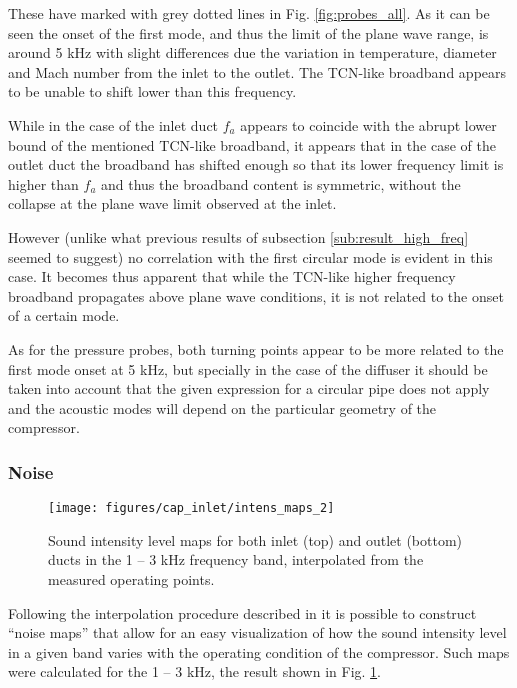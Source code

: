 These have marked with grey dotted lines in Fig. \ref{fig:probes_all}. As it can be seen the onset of the first mode, and thus the limit of the plane wave range, is around 5 kHz with slight differences due the variation in temperature, diameter and Mach number from the inlet to the outlet. The TCN-like broadband appears to be unable to shift lower than this frequency.

While in the case of the inlet duct $f_a$ appears to coincide with the abrupt lower bound of the mentioned TCN-like broadband, it appears that in the case of the outlet duct the broadband has shifted enough so that its lower frequency limit is higher than $f_a$ and thus the broadband content is symmetric, without the collapse at the plane wave limit observed at the inlet.

However (unlike what previous results of subsection \ref{sub:result_high_freq} seemed to suggest) no correlation with the first circular mode is evident in this case. It becomes thus apparent that while the TCN-like higher frequency broadband propagates above plane wave conditions, it is not related to the onset of a certain mode.

As for the pressure probes, both turning points appear to be more related to the first mode onset at 5 kHz, but specially in the case of the diffuser it should be taken into account that the given expression for a circular pipe does not apply and the acoustic modes will depend on the particular geometry of the compressor.

\subsubsection{Noise}

\begin{figure}[b!]
\centering
\texttt{[image: figures/cap\_inlet/intens\_maps\_2]}
\caption{Sound intensity level maps for both inlet (top) and outlet (bottom) ducts in the 1 -- 3 kHz frequency band, interpolated from the measured operating points.}
\label{fig:intens_maps}
\end{figure}

Following the interpolation procedure described in \cite{torregrosa2016experimental} it is possible to construct ``noise maps'' that allow for an easy visualization of how the sound intensity level in a given band varies with the operating condition of the compressor. Such maps were calculated for the 1 -- 3 kHz, the result shown in Fig. \ref{fig:intens_maps}.

